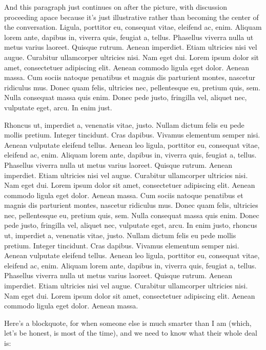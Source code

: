 \documentclass[
    12pt,
    letterpaper,
    oneside,
    noraggedright
]{turabian-researchpaper}
\begin{document}
\noindent And this paragraph just continues on after the picture, with
discussion proceeding apace because it's just illustrative rather than
becoming the center of the conversation. Ligula, porttitor eu, consequat
vitae, eleifend ac, enim. Aliquam lorem ante, dapibus in, viverra quis,
feugiat a, tellus. Phasellus viverra nulla ut metus varius laoreet.
Quisque rutrum. Aenean imperdiet. Etiam ultricies nisi vel augue.
Curabitur ullamcorper ultricies nisi. Nam eget dui. Lorem ipsum dolor
sit amet, consectetuer adipiscing elit. Aenean commodo ligula eget
dolor. Aenean massa. Cum sociis natoque penatibus et magnis dis
parturient montes, nascetur ridiculus mus. Donec quam felis, ultricies
nec, pellentesque eu, pretium quis, sem. Nulla consequat massa quis
enim. Donec pede justo, fringilla vel, aliquet nec, vulputate eget,
arcu. In enim just.

Rhoncus ut, imperdiet a, venenatis vitae, justo. Nullam dictum felis eu
pede mollis pretium. Integer tincidunt. Cras dapibus. Vivamus elementum
semper nisi. Aenean vulputate eleifend tellus. Aenean leo ligula,
porttitor eu, consequat vitae, eleifend ac, enim. Aliquam lorem ante,
dapibus in, viverra quis, feugiat a, tellus. Phasellus viverra nulla ut
metus varius laoreet. Quisque rutrum. Aenean imperdiet. Etiam ultricies
nisi vel augue. Curabitur ullamcorper ultricies nisi. Nam eget dui.
Lorem ipsum dolor sit amet, consectetuer adipiscing elit. Aenean commodo
ligula eget dolor. Aenean massa. Cum sociis natoque penatibus et magnis
dis parturient montes, nascetur ridiculus mus. Donec quam felis,
ultricies nec, pellentesque eu, pretium quis, sem. Nulla consequat massa
quis enim. Donec pede justo, fringilla vel, aliquet nec, vulputate eget,
arcu. In enim justo, rhoncus ut, imperdiet a, venenatis vitae, justo.
Nullam dictum felis eu pede mollis pretium. Integer tincidunt. Cras
dapibus. Vivamus elementum semper nisi. Aenean vulputate eleifend
tellus. Aenean leo ligula, porttitor eu, consequat vitae, eleifend ac,
enim. Aliquam lorem ante, dapibus in, viverra quis, feugiat a, tellus.
Phasellus viverra nulla ut metus varius laoreet. Quisque rutrum. Aenean
imperdiet. Etiam ultricies nisi vel augue. Curabitur ullamcorper
ultricies nisi. Nam eget dui. Lorem ipsum dolor sit amet, consectetuer
adipiscing elit. Aenean commodo ligula eget dolor. Aenean massa.

Here's a blockquote, for when someone else is much smarter than I am
(which, let's be honest, is most of the time), and we need to know what
their whole deal is:
\end{document}
